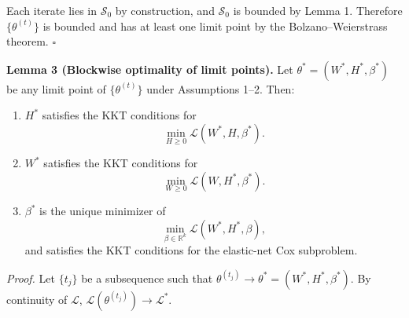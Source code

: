 \documentclass[
]{article}
\begin{document}
Each iterate lies in \(\mathcal{S}_0\) by construction, and
\(\mathcal{S}_0\) is bounded by Lemma 1. Therefore \(\{\theta^{(t)}\}\)
is bounded and has at least one limit point by the Bolzano--Weierstrass
theorem. \hfill\(\square\)

\vspace{0.5em}

\textbf{Lemma 3 (Blockwise optimality of limit points).} Let
\(\theta^*=(W^*,H^*,\beta^*)\) be any limit point of
\(\{\theta^{(t)}\}\) under Assumptions 1--2. Then:

\begin{enumerate}[label=(\roman*)]
  \item $H^*$ satisfies the KKT conditions for
        \[
          \min_{H\ge 0} \mathcal{L}(W^*,H,\beta^*).
        \]
  \item $W^*$ satisfies the KKT conditions for
        \[
          \min_{W\ge 0} \mathcal{L}(W,H^*,\beta^*).
        \]
  \item $\beta^*$ is the unique minimizer of
        \[
          \min_{\beta\in\mathbb{R}^k} \mathcal{L}(W^*,H^*,\beta),
        \]
        and satisfies the KKT conditions for the elastic-net Cox subproblem.
\end{enumerate}

\emph{Proof.} Let \(\{t_j\}\) be a subsequence such that
\(\theta^{(t_j)}\to\theta^*=(W^*,H^*,\beta^*)\). By continuity of
\(\mathcal{L}\), \(\mathcal{L}(\theta^{(t_j)})\to\mathcal{L}^*\).
\end{document}
